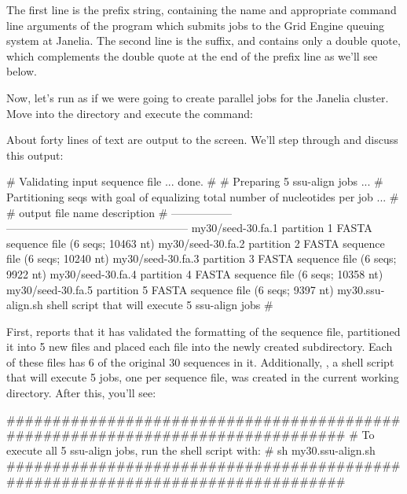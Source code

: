 The first line is the prefix string, containing the name and
appropriate command line arguments of the  program which
submits jobs to the Grid Engine queuing system at Janelia. The second
line is the suffix, and contains only a double quote, which
complements the double quote at the end of the prefix line as we'll
see below.

Now, let's run  as if we were going to create parallel
 jobs for the Janelia cluster.  Move into the
 directory and execute the command:


About forty lines of text are output to the screen. We'll step through
and discuss this output: 

\begin{sreoutput}
# Validating input sequence file ... done.
#
# Preparing 5 ssu-align jobs ...
# Partitioning seqs with goal of equalizing total number of nucleotides per job ...
#
# output file name   description                                       
# -----------------  --------------------------------------------------
  my30/seed-30.fa.1  partition 1 FASTA sequence file (6 seqs; 10463 nt)
  my30/seed-30.fa.2  partition 2 FASTA sequence file (6 seqs; 10240 nt)
  my30/seed-30.fa.3  partition 3 FASTA sequence file (6 seqs;  9922 nt)
  my30/seed-30.fa.4  partition 4 FASTA sequence file (6 seqs; 10358 nt)
  my30/seed-30.fa.5  partition 5 FASTA sequence file (6 seqs;  9397 nt)
  my30.ssu-align.sh  shell script that will execute 5 ssu-align jobs
#
\end{sreoutput}

First,  reports that it has validated the formatting of
the sequence file, partitioned it into 5 new files and placed each file
into the newly created  subdirectory. Each of these files has
6 of the original 30 sequences in it. Additionally,
, a shell script that will execute 5 jobs, one
per sequence file, was created in the current working directory. After
this, you'll see:

\begin{sreoutput}
################################################################################
# To execute all 5 ssu-align jobs, run the shell script with:
#	sh my30.ssu-align.sh
################################################################################
\end{sreoutput}

